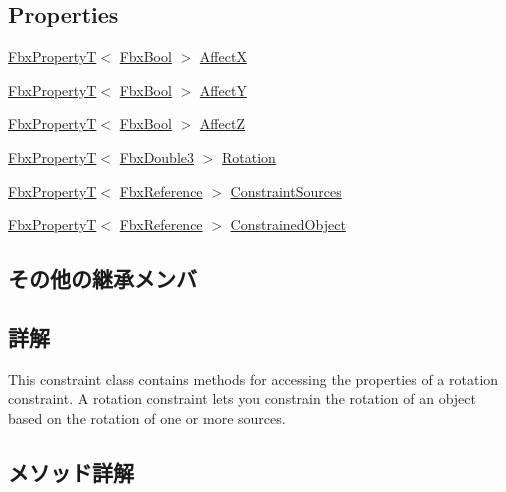 \subsection*{Properties}
\begin{DoxyCompactItemize}
\item 
\hyperlink{class_fbx_property_t}{Fbx\+PropertyT}$<$ \hyperlink{fbxtypes_8h_a92e0562b2fe33e76a242f498b362262e}{Fbx\+Bool} $>$ \hyperlink{class_fbx_constraint_rotation_a2fc6ae9614bcc41039d4abd37d3186aa}{AffectX}
\item 
\hyperlink{class_fbx_property_t}{Fbx\+PropertyT}$<$ \hyperlink{fbxtypes_8h_a92e0562b2fe33e76a242f498b362262e}{Fbx\+Bool} $>$ \hyperlink{class_fbx_constraint_rotation_a8b611c9fd76921a2780254dee0d33870}{AffectY}
\item 
\hyperlink{class_fbx_property_t}{Fbx\+PropertyT}$<$ \hyperlink{fbxtypes_8h_a92e0562b2fe33e76a242f498b362262e}{Fbx\+Bool} $>$ \hyperlink{class_fbx_constraint_rotation_af7a3d171bfeb0e5fa72d292756c64848}{AffectZ}
\item 
\hyperlink{class_fbx_property_t}{Fbx\+PropertyT}$<$ \hyperlink{fbxtypes_8h_ae0a96f14cde566774c7553aa7523b7a7}{Fbx\+Double3} $>$ \hyperlink{class_fbx_constraint_rotation_aa0bb0aa79b3f983ede4a376f12adb1c9}{Rotation}
\item 
\hyperlink{class_fbx_property_t}{Fbx\+PropertyT}$<$ \hyperlink{fbxtypes_8h_a44df6a2eec915cf27cd481e5c5e48a24}{Fbx\+Reference} $>$ \hyperlink{class_fbx_constraint_rotation_ac9bb2a7227a6034425e06395a03d57a6}{Constraint\+Sources}
\item 
\hyperlink{class_fbx_property_t}{Fbx\+PropertyT}$<$ \hyperlink{fbxtypes_8h_a44df6a2eec915cf27cd481e5c5e48a24}{Fbx\+Reference} $>$ \hyperlink{class_fbx_constraint_rotation_aee0715edab2a99b52a40f35aba1d662c}{Constrained\+Object}
\end{DoxyCompactItemize}
\subsection*{その他の継承メンバ}


\subsection{詳解}
This constraint class contains methods for accessing the properties of a rotation constraint. A rotation constraint lets you constrain the rotation of an object based on the rotation of one or more sources. 

\subsection{メソッド詳解}
\mbox{\label{class_fbx_constraint_rotation_ac025636c53dc8316f7da590de99bdb20}} 
